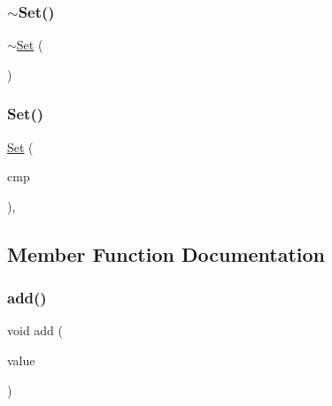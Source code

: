 \mbox{\label{classSet_a64c23991280aa719d76b8995d530115f}} 
\subsubsection{\texorpdfstring{$\sim$\+Set()}{~Set()}}
{\footnotesize\ttfamily $\sim$\mbox{\hyperlink{classSet}{Set}} (\begin{DoxyParamCaption}{ }\end{DoxyParamCaption})\hspace{0.3cm}{\ttfamily [virtual]}}

\mbox{\label{classSet_ab7b872ef8c76e7185adeb205f1120248}} 
\subsubsection{\texorpdfstring{Set()}{Set()}\hspace{0.1cm}{\footnotesize\ttfamily [7/7]}}
{\footnotesize\ttfamily \mbox{\hyperlink{classSet}{Set}} (\begin{DoxyParamCaption}\item[{Compare\+Type}]{cmp }\end{DoxyParamCaption})\hspace{0.3cm}{\ttfamily [inline]}, {\ttfamily [explicit]}}



\subsection{Member Function Documentation}
\mbox{\label{classSet_ab901606bf3a8019c986f0cf9a9f298dc}} 
\subsubsection{\texorpdfstring{add()}{add()}}
{\footnotesize\ttfamily void add (\begin{DoxyParamCaption}\item[{const Value\+Type \&}]{value }\end{DoxyParamCaption})}

\mbox{\label{classSet_aae14ee5e7f12c3325b0e85115798426a}} 
